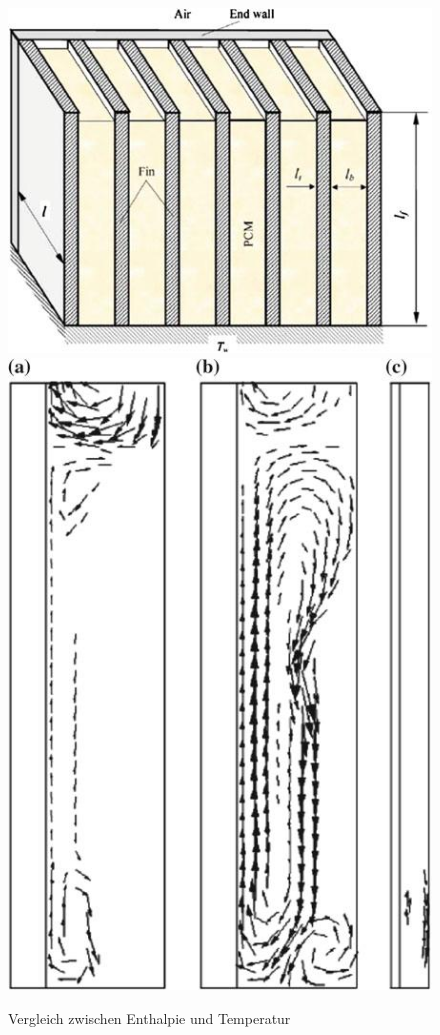 \documentclass[11pt,a4paper]{scrartcl}
\begin{document}
\begin{figure}[h!]
\begin{center}
\includegraphics[scale=0.4]{images/threedimensionalphysicalmodel.jpg}
\hspace{1cm}
\includegraphics[scale=0.2]{images/simulatedvelocity.jpg}
\caption{Vergleich zwischen Enthalpie und Temperatur \cite{WasteEnergyHarvesting}}
\label{fig:threedimensionalphysicalmodel}
\label{fig:simulatedvelocity}
\end{center}
\end{figure}
\end{document}
